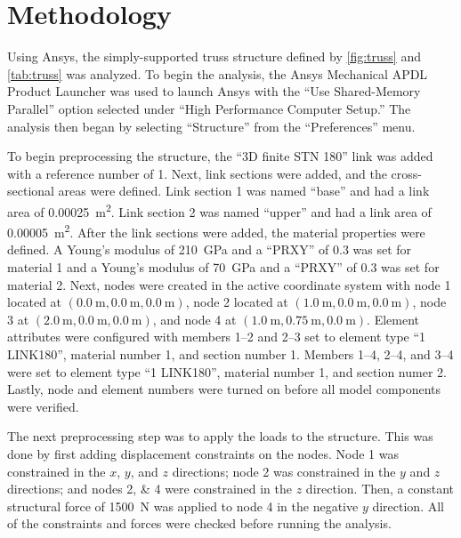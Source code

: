 \chapter{Methodology}\label{cp:methodology}

Using Ansys, the simply-supported truss structure defined by \autoref{fig:truss} and \autoref{tab:truss} was analyzed. To begin the analysis, the Ansys Mechanical APDL Product Launcher was used to launch Ansys with the ``Use Shared-Memory Parallel'' option selected under ``High Performance Computer Setup.'' The analysis then began by selecting ``Structure'' from the ``Preferences'' menu.

To begin preprocessing the structure, the ``3D finite STN 180'' link was added with a reference number of \num{1}. Next, link sections were added, and the cross-sectional areas were defined. Link section \num{1} was named ``base'' and had a link area of \qty{0.00025}{\meter^2}. Link section \num{2} was named ``upper'' and had a link area of \qty{0.00005}{\meter^2}. After the link sections were added, the material properties were defined. A Young's modulus of \qty{210}{\giga\pascal} and a ``PRXY'' of \num{0.3} was set for material \num{1} and a Young's modulus of \qty{70}{\giga\pascal} and a ``PRXY'' of \num{0.3} was set for material \num{2}. Next, nodes were created in the active coordinate system with node \num{1} located at $\left(\qty{0.0}{\meter},\qty{0.0}{\meter},\qty{0.0}{\meter}\right)$, node \num{2} located at $\left(\qty{1.0}{\meter},\qty{0.0}{\meter},\qty{0.0}{\meter}\right)$, node \num{3} at $\left(\qty{2.0}{\meter},\qty{0.0}{\meter},\qty{0.0}{\meter}\right)$, and node \num{4} at $\left(\qty{1.0}{\meter},\qty{0.75}{\meter},\qty{0.0}{\meter}\right)$. Element attributes were configured with members \numrange[range-phrase = --]{1}{2} and \numrange[range-phrase = --]{2}{3} set to element type ``1 LINK180'', material number \num{1}, and section number \num{1}. Members \numrange[range-phrase = --]{1}{4}, \numrange[range-phrase = --]{2}{4}, and \numrange[range-phrase = --]{3}{4} were set to element type ``1 LINK180'', material number \num{1}, and section numer \num{2}. Lastly, node and element numbers were turned on before all model components were verified. 

The next preprocessing step was to apply the loads to the structure. This was done by first adding displacement constraints on the nodes. Node \num{1} was constrained in the $x$, $y$, and $z$ directions; node \num{2} was constrained in the $y$ and $z$ directions; and nodes \numlist{2;4} were constrained in the $z$ direction. Then, a constant structural force of \qty{1500}{\newton} was applied to node \num{4} in the negative $y$ direction. All of the constraints and forces were checked before running the analysis. 

